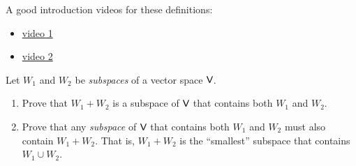 \begin{note}
A good introduction videos for these definitions:
\begin{itemize}
    \item \href{https://youtu.be/Rcj1-E3SAhs?t=901}{video 1}
    \item \href{https://www.youtube.com/watch?v=qs240Jhl6Rs}{video 2}
\end{itemize}
\end{note}

\begin{exercise} \label{exercise 1.3.23}
Let \(W_1\) and \(W_2\) be \emph{subspaces} of a vector space \(\textsf{V}\).
\begin{enumerate}
    \item Prove that \(W_1 + W_2\) is a subspace of \(\textsf{V}\) that contains both \(W_1\) and \(W_2\).
    \item Prove that any \emph{subspace} of \(\textsf{V}\) that contains both \(W_1\) and \(W_2\) must also contain \(W_1 + W_2\). That is, \(W_1 + W_2\) is the ``smallest'' subspace that contains \(W_1 \cup W_2\).
\end{enumerate}
\end{exercise}

